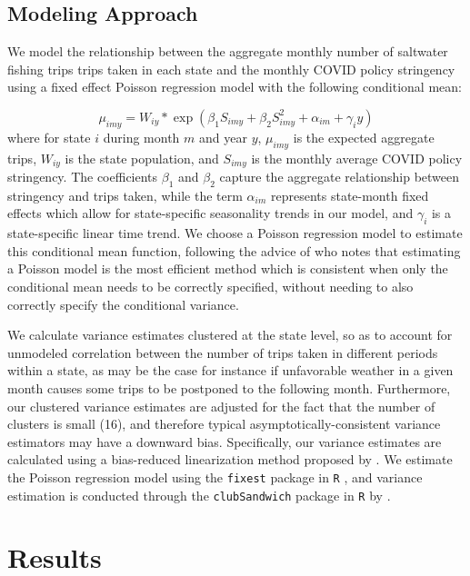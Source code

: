 \documentclass[12pt]{article}
\begin{document}
\subsection{Modeling Approach}

We model the relationship between the aggregate monthly number of
saltwater fishing trips trips taken in each state and the monthly COVID
policy stringency using a fixed effect Poisson regression model with the
following conditional mean:

\[\mu_{imy} = W_{iy}*\exp(\beta_1 S_{imy} + \beta_2 S_{imy}^2 + \alpha_{im} + \gamma_i y)\]
where for state \(i\) during month \(m\) and year \(y\), \(\mu_{imy}\)
is the expected aggregate trips, \(W_{iy}\) is the state population, and
\(S_{imy}\) is the monthly average COVID policy stringency. The
coefficients \(\beta_1\) and \(\beta_2\) capture the aggregate
relationship between stringency and trips taken, while the term
\(\alpha_{im}\) represents state-month fixed effects which allow for
state-specific seasonality trends in our model, and \(\gamma_i\) is a
state-specific linear time trend. We choose a Poisson regression model
to estimate this conditional mean function, following the advice of
\citet{wooldridge2010econometric} who notes that estimating a Poisson model is the most
efficient method which is consistent when only the conditional mean
needs to be correctly specified, without needing to also correctly
specify the conditional variance.

We calculate variance estimates clustered at the state level, so as to
account for unmodeled correlation between the number of trips taken in
different periods within a state, as may be the case for instance if
unfavorable weather in a given month causes some trips to be postponed
to the following month. Furthermore, our clustered variance estimates
are adjusted for the fact that the number of clusters is small (16), and
therefore typical asymptotically-consistent variance estimators may have
a downward bias. Specifically, our variance estimates are calculated
using a bias-reduced linearization method proposed by \citet{bell2002bias}. We estimate the Poisson regression model using the
\texttt{fixest} package in \texttt{R} \citep{berge2018Efficient}, and variance
estimation is conducted through the \texttt{clubSandwich} package in
\texttt{R} by \citet{pustejovsky2016Small}.

\section{Results}
\end{document}
